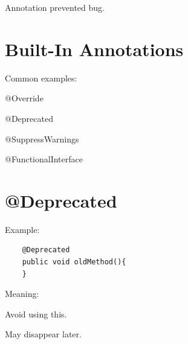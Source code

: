 \documentclass[11pt,a4paper]{book}
\begin{document}

Annotation prevented bug.


\section{Built-In Annotations}

Common examples:


@Override


@Deprecated


@SuppressWarnings


@FunctionalInterface


\section{@Deprecated}

Example:

\begin{verbatim} 
    @Deprecated
    public void oldMethod(){
    }
\end{verbatim}


Meaning:


Avoid using this.


May disappear later.


\end{document}
